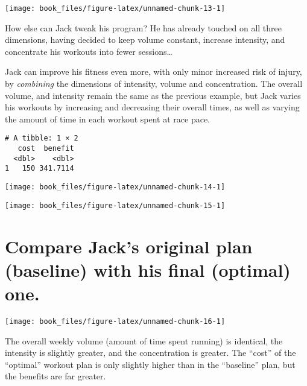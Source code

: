 \documentclass[]{tufte-handout}
\begin{document}
\texttt{[image: book\_files/figure-latex/unnamed-chunk-13-1]}

How else can Jack tweak his program? He has already touched on all three
dimensions, having decided to keep volume constant, increase intensity,
and concentrate his workouts into fewer sessions\ldots{}

Jack can improve his fitness even more, with only minor increased risk
of injury, by \emph{combining} the dimensions of intensity, volume and
concentration. The overall volume, and intensity remain the same as the
previous example, but Jack varies his workouts by increasing and
decreasing their overall times, as well as varying the amount of time in
each workout spent at race pace.

\begin{verbatim}
# A tibble: 1 × 2
   cost  benefit
  <dbl>    <dbl>
1   150 341.7114
\end{verbatim}

\begin{marginfigure}
\texttt{[image: book\_files/figure-latex/unnamed-chunk-14-1]} \end{marginfigure}

\texttt{[image: book\_files/figure-latex/unnamed-chunk-15-1]}

\section{Compare Jack's original plan (baseline) with his final
(optimal)
one.}\label{compare-jacks-original-plan-baseline-with-his-final-optimal-one.}

\texttt{[image: book\_files/figure-latex/unnamed-chunk-16-1]}

The overall weekly volume (amount of time spent running) is identical,
the intensity is slightly greater, and the concentration is greater. The
``cost'' of the ``optimal'' workout plan is only slightly higher than in
the ``baseline'' plan, but the benefits are far greater.


\end{document}
